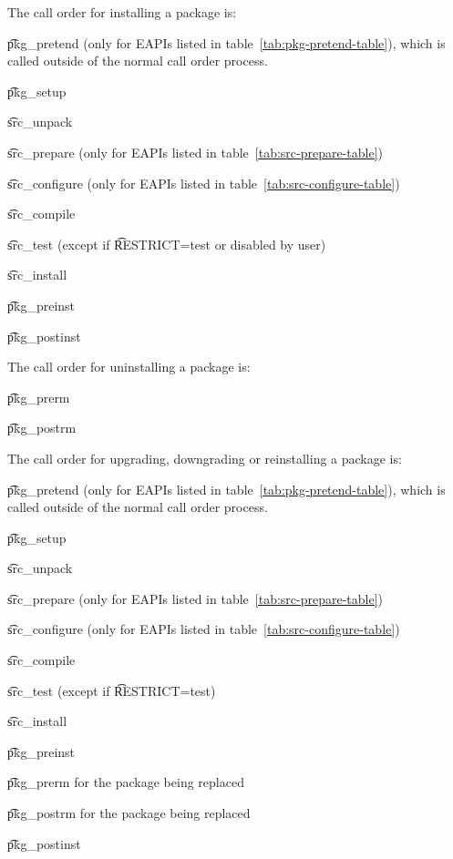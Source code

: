 The call order for installing a package is:
\nobreakpar
\begin{compactitem}
\item \t{pkg_pretend} (only for EAPIs listed in table~\ref{tab:pkg-pretend-table}), which is called
    outside of the normal call order process.
\item \t{pkg_setup}
\item \t{src_unpack}
\item \t{src_prepare} (only for EAPIs listed in table~\ref{tab:src-prepare-table})
\item \t{src_configure} (only for EAPIs listed in table~\ref{tab:src-configure-table})
\item \t{src_compile}
\item \t{src_test} (except if \t{RESTRICT=test} or disabled by user)
\item \t{src_install}
\item \t{pkg_preinst}
\item \t{pkg_postinst}
\end{compactitem}

The call order for uninstalling a package is:

\begin{compactitem}
\item \t{pkg_prerm}
\item \t{pkg_postrm}
\end{compactitem}

The call order for upgrading, downgrading or reinstalling a package is:

\begin{compactitem}
\item \t{pkg_pretend} (only for EAPIs listed in table~\ref{tab:pkg-pretend-table}), which is called
    outside of the normal call order process.
\item \t{pkg_setup}
\item \t{src_unpack}
\item \t{src_prepare} (only for EAPIs listed in table~\ref{tab:src-prepare-table})
\item \t{src_configure} (only for EAPIs listed in table~\ref{tab:src-configure-table})
\item \t{src_compile}
\item \t{src_test} (except if \t{RESTRICT=test})
\item \t{src_install}
\item \t{pkg_preinst}
\item \t{pkg_prerm} for the package being replaced
\item \t{pkg_postrm} for the package being replaced
\item \t{pkg_postinst}
\end{compactitem}

